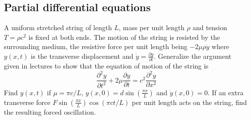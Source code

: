 \documentclass[a4paper]{article}
\begin{document}
\subsection*{Partial differential equations}
\begin{qns}
A uniform stretched string of length $L$, mass per unit length $\rho$ and tension $T =\rho c^2$ is fixed at both ends. The motion of the string is resisted by the surrounding medium, the resistive force per unit length being $-2\mu\rho\dot{y}$ where $y(x,t)$ is the transverse displacement and $\dot{y}=\frac{\partial y}{\partial t}$. Generalize the argument given in lectures to show that
the equation of motion of the string is
$$\frac{\partial^2y}{\partial t^2}+2\mu\frac{\partial y}{\partial t}=c^2\frac{\partial^2y}{\partial x^2}$$
Find $y(x,t)$ if $\mu=\pi c/L$, $y(x,0)=d\sin(\frac{\pi x}{L})$ and $\dot{y}(x,0)=0$. If an extra transverse force $F\sin(\frac{\pi x}{L})\cos(\pi ct/L)$ per unit length acts on the string, find the resulting forced oscillation.
\end{qns}
\end{document}

